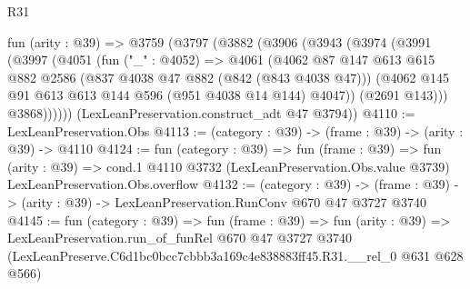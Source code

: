 \begin{lexlean}{R31}
\begin{coremodule}
  fun (arity : @39) =>
  @3759
    (@3797
      (@3882
        (@3906
          (@3943
            (@3974
              (@3991
                (@3997
                  (@4051
                    (fun ("_" : @4052) =>
                    @4061
                      (@4062
                        @87
                        @147
                        @613
                        @615
                        @882
                        @2586
                        (@837 @4038 @47 @882 (@842 (@843 @4038 @47)))
                        (@4062 @145 @91 @613 @613 @144 @596 (@951 @4038 @14 @144) @4047))
                      (@2691 @143)))
                  @3868))))))
      (LexLeanPreservation.construct_adt @47 @3794))
@4110 := LexLeanPreservation.Obs
@4113 := (category : @39) -> (frame : @39) -> (arity : @39) -> @4110
@4124 := fun (category : @39) =>
  fun (frame : @39) =>
  fun (arity : @39) =>
  cond.{1} @4110 @3732 (LexLeanPreservation.Obs.value @3739) LexLeanPreservation.Obs.overflow
@4132 := (category : @39) ->
  (frame : @39) -> (arity : @39) -> LexLeanPreservation.RunConv @670 @47 @3727 @3740
@4145 := fun (category : @39) =>
  fun (frame : @39) =>
  fun (arity : @39) =>
  LexLeanPreservation.run_of_funRel
    @670
    @47
    @3727
    @3740
    (LexLeanPreserve.C6d1bc0bcc7cbbb3a169c4e838883ff45.R31.__rel_0 @631 @628 @566)
\end{coremodule}
\end{lexlean}
